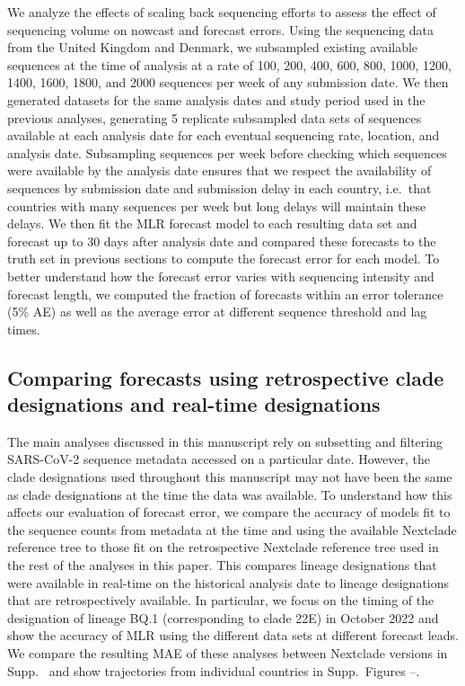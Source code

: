 \documentclass[10pt,letterpaper]{article}
\begin{document}
We analyze the effects of scaling back sequencing efforts to assess the effect of sequencing volume on nowcast and forecast errors.
Using the sequencing data from the United Kingdom and Denmark, we subsampled existing available sequences at the time of analysis at a rate of 100, 200, 400, 600, 800, 1000, 1200, 1400, 1600, 1800, and 2000 sequences per week of any submission date.
We then generated datasets for the same analysis dates and study period used in the previous analyses, generating 5 replicate subsampled data sets of sequences available at each analysis date for each eventual sequencing rate, location, and analysis date.
Subsampling sequences per week before checking which sequences were available by the analysis date ensures that we respect the availability of sequences by submission date and submission delay in each country, i.e.\ that countries with many sequences per week but long delays will maintain these delays.
We then fit the MLR forecast model to each resulting data set and forecast up to 30 days after analysis date and compared these forecasts to the truth set in previous sections to compute the forecast error for each model.
To better understand how the forecast error varies with sequencing intensity and forecast length, we computed the fraction of forecasts within an error tolerance (5\% AE) as well as the average error at different sequence threshold and lag times.

\subsection*{Comparing forecasts using retrospective clade designations and real-time designations}

The main analyses discussed in this manuscript rely on subsetting and filtering SARS-CoV-2 sequence metadata accessed on a particular date.
However, the clade designations used throughout this manuscript may not have been the same as clade designations at the time the data was available.
To understand how this affects our evaluation of forecast error, we compare the accuracy of models fit to the sequence counts from metadata at the time and using the available Nextclade reference tree to those fit on the retrospective Nextclade reference tree used in the rest of the analyses in this paper.
This compares lineage designations that were available in real-time on the historical analysis date to lineage designations that are retrospectively available.
In particular, we focus on the timing of the designation of lineage BQ.1 (corresponding to clade 22E) in October 2022 and show the accuracy of MLR using the different data sets at different forecast leads.
We compare the resulting MAE of these analyses between Nextclade versions in Supp.\   and show trajectories from individual countries in Supp.\ Figures --.
\end{document}
